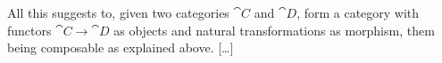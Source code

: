 All this suggests to, given two categories \(\cat C\) and \(\cat D\), form a category with functors \(\cat C \to \cat D\) as objects and natural transformations as morphism, them being composable as explained above. [\dots{}]






